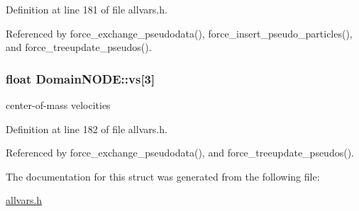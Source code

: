 Definition at line 181 of file allvars.h.



Referenced by force\_\-exchange\_\-pseudodata(), force\_\-insert\_\-pseudo\_\-particles(), and force\_\-treeupdate\_\-pseudos().

\hypertarget{structDomainNODE_a52c312bfff90fd7236c7d1e176c03d9c}{
\subsubsection[{vs}]{\setlength{\rightskip}{0pt plus 5cm}float {\bf DomainNODE::vs}\mbox{[}3\mbox{]}}}
\label{structDomainNODE_a52c312bfff90fd7236c7d1e176c03d9c}
center-\/of-\/mass velocities 

Definition at line 182 of file allvars.h.



Referenced by force\_\-exchange\_\-pseudodata(), and force\_\-treeupdate\_\-pseudos().



The documentation for this struct was generated from the following file:\begin{DoxyCompactItemize}
\item 
\hyperlink{allvars_8h}{allvars.h}\end{DoxyCompactItemize}

